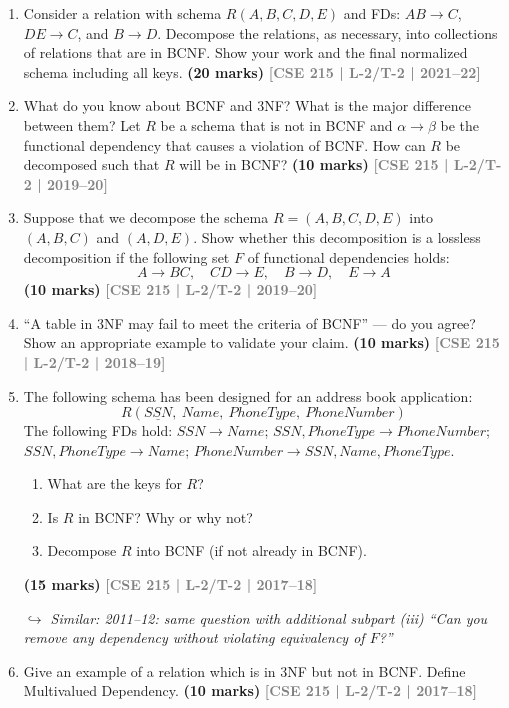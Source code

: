 \documentclass[12pt]{article}
\newcommand{\yr}[1]{\hfill\textcolor{gray}{\small\textbf{[#1]}}}
\newcommand{\mk}[1]{\textcolor{orange!70!black}{\small\textbf{(#1 marks)}}}
\newcommand{\variant}[1]{\par\vspace{1pt}\textcolor{blue!50!black}%
  {\footnotesize\textit{$\hookrightarrow$ Similar: #1}}}
\begin{document}
\begin{enumerate}
\item Consider a relation with schema $R(A, B, C, D, E)$ and FDs: $AB \to C$, $DE \to C$, and $B \to D$. Decompose the relations, as necessary, into collections of relations that are in BCNF. Show your work and the final normalized schema including all keys.
\mk{20} \yr{CSE 215 | L-2/T-2 | 2021--22}



\item What do you know about BCNF and 3NF? What is the major difference between them? Let $R$ be a schema that is not in BCNF and $\alpha \to \beta$ be the functional dependency that causes a violation of BCNF. How can $R$ be decomposed such that $R$ will be in BCNF?
\mk{10} \yr{CSE 215 | L-2/T-2 | 2019--20}


\item Suppose that we decompose the schema $R = (A, B, C, D, E)$ into $(A, B, C)$ and $(A, D, E)$. Show whether this decomposition is a lossless decomposition if the following set $F$ of functional dependencies holds:
\[A \to BC,\quad CD \to E,\quad B \to D,\quad E \to A\]
\mk{10} \yr{CSE 215 | L-2/T-2 | 2019--20}


\item ``A table in 3NF may fail to meet the criteria of BCNF'' --- do you agree? Show an appropriate example to validate your claim.
\mk{10} \yr{CSE 215 | L-2/T-2 | 2018--19}


\item The following schema has been designed for an address book application:
\[R(\underline{SSN},\ Name,\ PhoneType,\ PhoneNumber)\]
The following FDs hold: $SSN \to Name$;\; $SSN, PhoneType \to PhoneNumber$;\; $SSN, PhoneType \to Name$;\; $PhoneNumber \to SSN, Name, PhoneType$.
\begin{enumerate}
  \item What are the keys for $R$?
  \item Is $R$ in BCNF? Why or why not?
  \item Decompose $R$ into BCNF (if not already in BCNF).
\end{enumerate}
\mk{15} \yr{CSE 215 | L-2/T-2 | 2017--18}
\variant{2011--12: same question with additional subpart (iii) ``Can you remove any dependency without violating equivalency of $F$?''}


\item Give an example of a relation which is in 3NF but not in BCNF. Define Multivalued Dependency.
\mk{10} \yr{CSE 215 | L-2/T-2 | 2017--18}



\end{enumerate}
\end{document}
